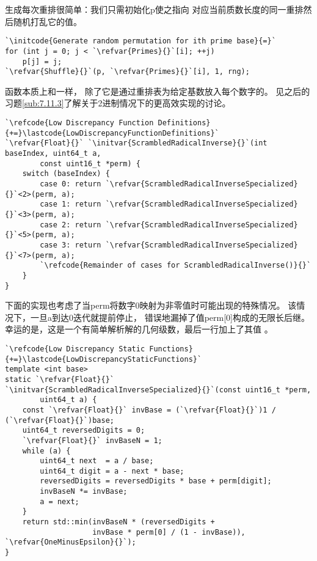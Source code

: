 生成每次重排很简单：我们只需初始化{\ttfamily p}使之指向
对应当前质数长度的同一重排然后随机打乱它的值。
\begin{lstlisting}
`\initcode{Generate random permutation for ith prime base}{=}`
for (int j = 0; j < `\refvar{Primes}{}`[i]; ++j)
    p[j] = j;
`\refvar{Shuffle}{}`(p, `\refvar{Primes}{}`[i], 1, rng);
\end{lstlisting}

函数本质上和一样，
除了它是通过重排表为给定基数放入每个数字的。
见之后的习题\ref{sub:7.11.3}了解关于2进制情况下的更高效实现的讨论。
\begin{lstlisting}
`\refcode{Low Discrepancy Function Definitions}{+=}\lastcode{LowDiscrepancyFunctionDefinitions}`
`\refvar{Float}{}` `\initvar{ScrambledRadicalInverse}{}`(int baseIndex, uint64_t a,
        const uint16_t *perm) {
    switch (baseIndex) {
        case 0: return `\refvar{ScrambledRadicalInverseSpecialized}{}`<2>(perm, a);
        case 1: return `\refvar{ScrambledRadicalInverseSpecialized}{}`<3>(perm, a);
        case 2: return `\refvar{ScrambledRadicalInverseSpecialized}{}`<5>(perm, a);
        case 3: return `\refvar{ScrambledRadicalInverseSpecialized}{}`<7>(perm, a);
        `\refcode{Remainder of cases for ScrambledRadicalInverse()}{}`
    }
}
\end{lstlisting}

下面的实现也考虑了当{\ttfamily perm}将数字0映射为非零值时可能出现的特殊情况。
该情况下，一旦{\ttfamily a}到达0迭代就提前停止，
错误地漏掉了值{\ttfamily perm[0]}构成的无限长后继。
幸运的是，这是一个有简单解析解的几何级数，最后一行加上了其值
。
\begin{lstlisting}
`\refcode{Low Discrepancy Static Functions}{+=}\lastcode{LowDiscrepancyStaticFunctions}`
template <int base>
static `\refvar{Float}{}` `\initvar{ScrambledRadicalInverseSpecialized}{}`(const uint16_t *perm,
        uint64_t a) {
    const `\refvar{Float}{}` invBase = (`\refvar{Float}{}`)1 / (`\refvar{Float}{}`)base;
    uint64_t reversedDigits = 0;
    `\refvar{Float}{}` invBaseN = 1;
    while (a) {
        uint64_t next  = a / base;
        uint64_t digit = a - next * base;
        reversedDigits = reversedDigits * base + perm[digit];
        invBaseN *= invBase;
        a = next;
    }
    return std::min(invBaseN * (reversedDigits +
                    invBase * perm[0] / (1 - invBase)), `\refvar{OneMinusEpsilon}{}`);
}
\end{lstlisting}

